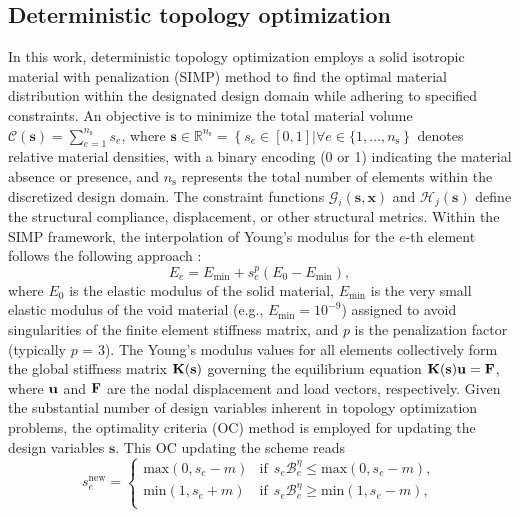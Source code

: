 \documentclass[preprint,3p]{elsarticle}
\begin{document}
\begin{linenumbers}
\subsection{Deterministic topology optimization }\label{SUBSEC:22}
In this work, deterministic topology optimization employs a solid isotropic material with penalization (SIMP) \cite{andreassen2011, sigmund2001} method to find the optimal material distribution within the designated design domain while adhering to specified constraints. An objective is to minimize the total material volume $\mathcal{C}(\textbf{s}) = \sum_{e=1}^{n_\text{s}}{s_{e}}$, where $\textbf{s}\in\mathbb{R}^{n_\text{s}} = \left\{{s_{e}}\in \left[ 0,1 \right]|\forall e\in\{1,\dots,{n_\text{s}}\right\}$ denotes relative material densities, with a binary encoding (0 or 1) indicating the material absence or presence, and $n_\text{s}$ represents the total number of elements within the discretized design domain. The constraint functions $\mathcal{G}_i(\textbf{s},\textbf{x})$ and $\mathcal{H}_j(\textbf{s})$ define the structural compliance, displacement, or other structural metrics. Within the SIMP framework, the interpolation of Young’s modulus for the $e$-th element follows the following approach \cite{andreassen2011}:
\begin{equation}
E_e=E_{\min}+s_e^p\left(E_0-E_{\min}\right), 
\label{EQ:2}
\end{equation}
where $E_0$ is the elastic modulus of the solid material, $E_{\min}$ is the very small elastic modulus of the void material (e.g., $E_{\min} = 10^{-9}$) assigned to avoid singularities of the finite element stiffness matrix, and $p$ is the penalization factor (typically $p$ = 3). The Young’s modulus values for all elements collectively form the global stiffness matrix ${\bf K(s)}$  governing the equilibrium equation ${\bf K(s)}{\bf u}={\bf F}$, where ${\bf u}$ and ${\bf F}$ are the nodal displacement and load vectors, respectively.
Given the substantial number of design variables inherent in topology optimization problems, the optimality criteria  (OC) method \cite{andreassen2011,zhou2021} is employed for updating the design variables $\textbf{s}$.
This OC updating the scheme reads
\begin{equation}
s_e^\mathrm{new}=\begin{cases}{\mathrm{max}\left(0,s_{e}-m\right)} & {{\mathrm{if}\ \ s_{e}\mathcal{B}_{e}^{\eta}\leq\mathrm{max}\left(0,s_{e}-m\right)}},\\
{\mathrm{min}\left(1,s_{e}+m\right)} & {{\mathrm{if}\ \ s_{e}\mathcal{B}_{e}^{\eta}\geq\mathrm{min}\left(1,s_{e}-m\right)}}, \\

\end{cases}
\end{equation}
\end{linenumbers}
\end{document}
